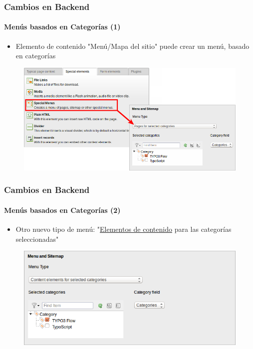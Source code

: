 
\begin{frame}[fragile]
	\frametitle{Cambios en Backend}
	\framesubtitle{Menús basados en Categorías (1)}

	\begin{itemize}
		\item Elemento de contenido "Menú/Mapa del sitio" puede crear un menú, basado en categorías
	\end{itemize}

	\begin{figure}
		\includegraphics[width=0.8\linewidth]{Images/BackendChanges/CategoryBasedMenus.png}
	\end{figure}

\end{frame}


\begin{frame}[fragile]
	\frametitle{Cambios en Backend}
	\framesubtitle{Menús basados en Categorías (2)}

	\begin{itemize}
		\item Otro nuevo tipo de menú: "\underline{Elementos de contenido} para las categorías seleccionadas"
	\end{itemize}

	\begin{figure}
		\includegraphics[width=0.6\linewidth]{Images/BackendChanges/ContentElementsForSelectedCategories.png}
	\end{figure}

\end{frame}

